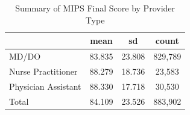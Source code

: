 \begin{table}[htbp]\centering
\def\sym#1{\ifmmode^{#1}\else\(^{#1}\)\fi}
\caption{Summary of MIPS Final Score by Provider Type}
\begin{tabular}{l*{1}{ccc}}
\toprule
                    &        mean&          sd&       count\\
\midrule
MD/DO               &      83.835&      23.808&     829,789\\
Nurse Practitioner  &      88.279&      18.736&      23,583\\
Physician Assistant &      88.330&      17.718&      30,530\\
Total               &      84.109&      23.526&     883,902\\
\bottomrule
\end{tabular}
\end{table}
